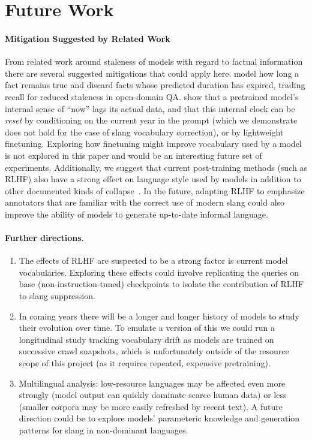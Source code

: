 \documentclass[11pt]{article}
\begin{document}
\section{Future Work}

\paragraph{Mitigation Suggested by Related Work} From related work around staleness of models with regard to factual information there are several suggested mitigations that could apply here. \citet{zhang2023mitigatingtemporal} model how long a fact remains true and discard facts whose predicted duration has expired, trading recall for reduced staleness in open-domain QA. \citet{zhao2024temporal} show that a pretrained model's internal sense of ``now'' lags its actual data, and that this internal clock can be \textit{reset} by conditioning on the current year in the prompt (which we demonstrate does not hold for the case of slang vocabulary correction), or by lightweight finetuning. Exploring how finetuning might improve vocabulary used by a model is not explored in this paper and would be an interesting future set of experiments. %
Additionally, we suggest that current post-training methods (such as RLHF) also have a strong effect on language style used by models in addition to other documented kinds of collapse~\cite{casper2023open, xiao2024algorithmic}.
In the future, adapting RLHF to emphasize annotators that are familiar with the correct use of modern slang could also improve the ability of models to generate up-to-date informal language.

\paragraph{Further directions.}
\begin{enumerate}
  \item The effects of RLHF are suspected to be a strong factor is current model vocabularies. Exploring these effects could involve replicating the queries on base (non-instruction-tuned) checkpoints to isolate the contribution of RLHF to slang suppression.
  \item In coming years there will be a longer and longer history of models to study their evolution over time. To emulate a version of this we could run a longitudinal study tracking vocabulary drift as models are trained on successive crawl snapshots, which is unfortunately outside of the resource scope of this project (as it requires repeated, expensive pretraining).
  \item Multilingual analysis: low-resource languages may be affected even more strongly (model output can quickly dominate scarce human data) or less (smaller corpora may be more easily refreshed by recent text). A future direction could be to explore models' parameteric knowledge and generation patterns for slang in non-dominant languages.
\end{enumerate}
\end{document}
